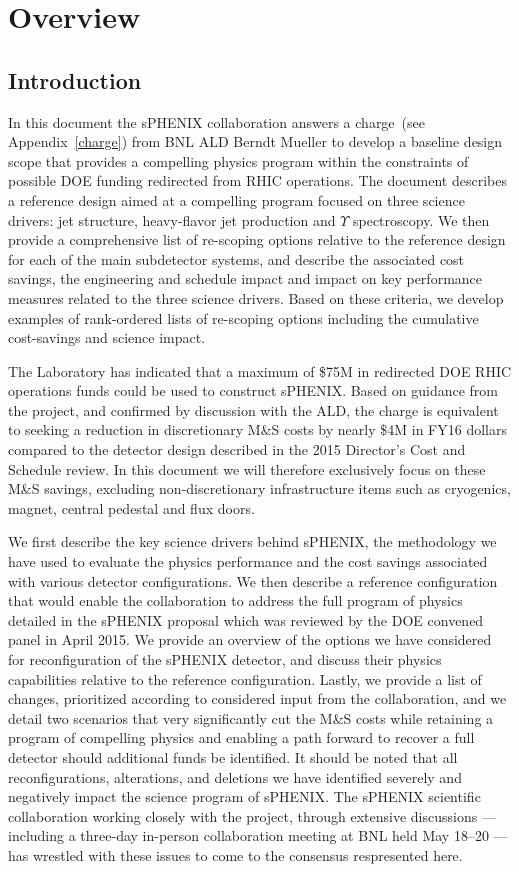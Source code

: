 \chapter{Overview}
\label{configurations}
\setcounter{page}{1}

\section{Introduction}
In this document the sPHENIX collaboration answers a charge~(see
Appendix~\ref{charge}) from BNL ALD Berndt Mueller to develop a
baseline design scope that provides a compelling physics program
within the constraints of possible DOE funding redirected from RHIC
operations. The document describes a reference design aimed at a
compelling program focused on three science drivers: jet structure,
heavy-flavor jet production and $\Upsilon$ spectroscopy. We then
provide a comprehensive list of re-scoping options relative to the
reference design for each of the main subdetector systems, and
describe the associated cost savings, the engineering and schedule
impact and impact on key performance measures related to the three
science drivers. Based on these criteria, we develop examples of
rank-ordered lists of re-scoping options including the cumulative
cost-savings and science impact.

The Laboratory has indicated that a maximum of \$75M in redirected DOE
RHIC operations funds could be used to construct sPHENIX.  Based on
guidance from the project, and confirmed by discussion with the ALD,
the charge is equivalent to seeking a reduction in discretionary M\&S
costs by nearly \$4M in FY16 dollars compared to the detector design
described in the 2015 Director's Cost and Schedule review.  In this
document we will therefore exclusively focus on these M\&S savings,
excluding non-discretionary infrastructure items such as cryogenics,
magnet, central pedestal and flux doors.

We first describe the key science drivers behind sPHENIX, the
methodology we have used to evaluate the physics performance and the
cost savings associated with various detector configurations.  We then
describe a reference configuration that would enable the collaboration
to address the full program of physics detailed in the sPHENIX
proposal which was reviewed by the DOE convened panel in April 2015.
We provide an overview of the options we have considered for
reconfiguration of the sPHENIX detector, and discuss their physics
capabilities relative to the reference configuration.  Lastly, we
provide a list of changes, prioritized according to considered input
from the collaboration, and we detail two scenarios that very
significantly cut the M\&S costs while retaining a program of
compelling physics and enabling a path forward to recover a full
detector should additional funds be identified.  It should be noted
that all reconfigurations, alterations, and deletions we have
identified severely and negatively impact the science program of
sPHENIX.  The sPHENIX scientific collaboration working closely with
the project, through extensive discussions --- including a three-day
in-person collaboration meeting at BNL held May 18--20 --- has
wrestled with these issues to come to the consensus respresented here.
